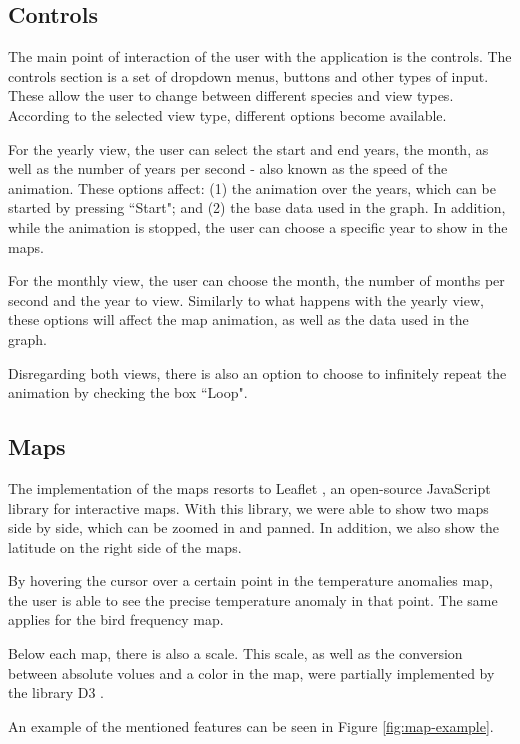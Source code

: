 \documentclass[journal]{vgtc}                %
\begin{document}
\subsection{Controls}

The main point of interaction of the user with the application is the controls. The controls section is a set of dropdown menus, buttons and other types of input. These allow the user to change between different species and view types. According to the selected view type, different options become available.

For the yearly view, the user can select the start and end years, the month, as well as the number of years per second - also known as the speed of the animation. These options affect: (1) the animation over the years, which can be started by pressing ``Start"; and (2) the base data used in the graph. In addition, while the animation is stopped, the user can choose a specific year to show in the maps.

For the monthly view, the user can choose the month, the number of months per second and the year to view. Similarly to what happens with the yearly view, these options will affect the map animation, as well as the data used in the graph.

Disregarding both views, there is also an option to choose to infinitely repeat the animation by checking the box ``Loop".

\subsection{Maps}

The implementation of the maps resorts to Leaflet \cite{leaflet}, an open-source JavaScript library for interactive maps. With this library, we were able to show two maps side by side, which can be zoomed in and panned. In addition, we also show the latitude on the right side of the maps.

By hovering the cursor over a certain point in the temperature anomalies map, the user is able to see the precise temperature anomaly in that point. The same applies for the bird frequency map.

Below each map, there is also a scale. This scale, as well as the conversion between absolute volues and a color in the map, were partially implemented by the library D3 \cite{d3js}.

An example of the mentioned features can be seen in Figure \ref{fig:map-example}.
\end{document}
